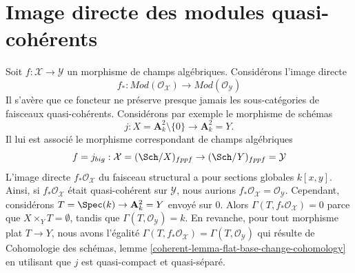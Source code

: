 \section{Image directe des modules quasi-cohérents}
\label{section-pushforward-quasi-coherent}

\noindent
Soit $f : \mathcal{X} \to \mathcal{Y}$ un morphisme de champs algébriques.
Considérons l'image directe
$$
f_* :
\textit{Mod}(\mathcal{O}_\mathcal{X})
\longrightarrow
\textit{Mod}(\mathcal{O}_\mathcal{Y})
$$
Il s'avère que ce foncteur ne préserve presque jamais les sous-catégories
de faisceaux quasi-cohérents. Considérons par exemple le morphisme de schémas
$$
j : X = \mathbf{A}^2_k \setminus \{0\} \longrightarrow \mathbf{A}^2_k = Y.
$$
Il lui est associé le morphisme correspondant de champs algébriques
$$
f = j_{big} : \mathcal{X} = (\Sch/X)_{fppf} \to
(\Sch/Y)_{fppf} = \mathcal{Y}
$$
L'image directe $f_*\mathcal{O}_\mathcal{X}$ du faisceau structural a pour
sections globales $k[x, y]$. Ainsi, si $f_*\mathcal{O}_\mathcal{X}$ était
quasi-cohérent sur $\mathcal{Y}$, nous aurions
$f_*\mathcal{O}_\mathcal{X} = \mathcal{O}_\mathcal{Y}$. Cependant,
considérons $T = \Spec(k) \to \mathbf{A}^2_k = Y$ envoyé sur $0$.
Alors $\Gamma(T, f_*\mathcal{O}_\mathcal{X}) = 0$ parce que
$X \times_Y T = \emptyset$, tandis que $\Gamma(T, \mathcal{O}_\mathcal{Y}) = k$.
En revanche, pour tout morphisme plat $T \to Y$, nous avons l'égalité
$\Gamma(T, f_*\mathcal{O}_\mathcal{X}) = \Gamma(T, \mathcal{O}_\mathcal{Y})$
qui résulte de
Cohomologie des schémas, lemme \ref{coherent-lemma-flat-base-change-cohomology}
en utilisant que $j$ est quasi-compact et quasi-séparé.

